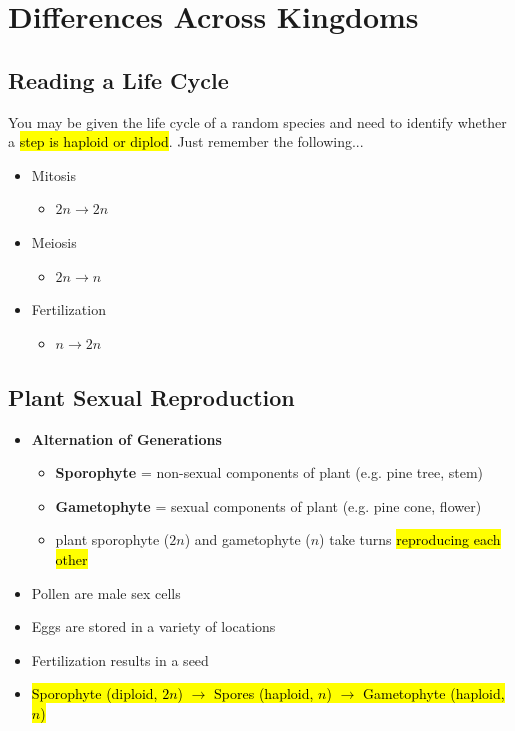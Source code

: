 \documentclass[a4paper,12pt]{article}
\begin{document}
\pagebreak

\section{Differences Across Kingdoms}
\subsection{Reading a Life Cycle}
You may be given the life cycle of a random species and need to identify whether a \hl{step is haploid or diplod}. Just remember the following...
\begin{itemize}
    \item{
            Mitosis
            \begin{itemize}
                \item{$2n \longrightarrow 2n$}
            \end{itemize}
        }
    \item{
            Meiosis
            \begin{itemize}
                \item{$2n \longrightarrow n$}
            \end{itemize}
        }
    \item{
            Fertilization
            \begin{itemize}
                \item{$n \longrightarrow 2n$}
            \end{itemize}
        }
\end{itemize}

\subsection{Plant Sexual Reproduction}
\begin{itemize}
    \item{
            \textbf{Alternation of Generations}
            \begin{itemize}
                \item{\textbf{Sporophyte} = non-sexual components of plant (e.g. pine tree, stem)}
                \item{\textbf{Gametophyte} = sexual components of plant (e.g. pine cone, flower)}
                \item{plant sporophyte ($2n$) and gametophyte ($n$) take turns \hl{reproducing each other}}
            \end{itemize}
        }
    \item{Pollen are \male\! male sex cells}
    \item{\female\! Eggs are stored in a variety of locations}
    \item{Fertilization results in a seed}
    \item{\hl{Sporophyte (diploid, $2n$) $\longrightarrow$ Spores (haploid, $n$) $\longrightarrow$ Gametophyte (haploid, $n$)}}
\end{itemize}
\end{document}
